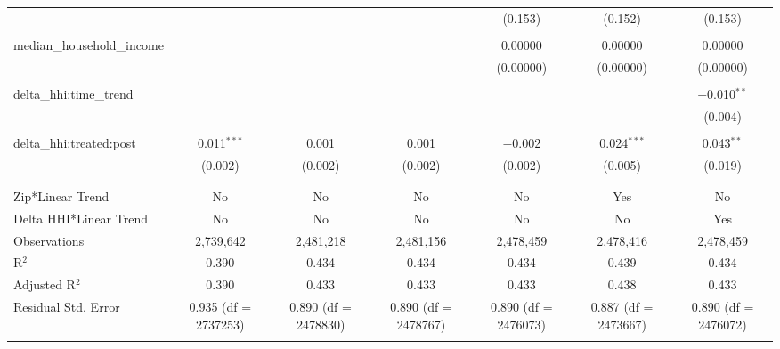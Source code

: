 \begin{table}[H]
{\begin{tabular}{@{\extracolsep{5pt}}lcccccc}
   &  &  &  & (0.153) & (0.152) & (0.153) \\  

   & & & & & & \\  

  median\_household\_income &  &  &  & 0.00000 & 0.00000 & 0.00000 \\  

   &  &  &  & (0.00000) & (0.00000) & (0.00000) \\  

   & & & & & & \\  

  delta\_hhi:time\_trend &  &  &  &  &  & $-$0.010$^{**}$ \\  

   &  &  &  &  &  & (0.004) \\  

   & & & & & & \\  

  delta\_hhi:treated:post & 0.011$^{***}$ & 0.001 & 0.001 & $-$0.002 & 0.024$^{***}$ & 0.043$^{**}$ \\  

   & (0.002) & (0.002) & (0.002) & (0.002) & (0.005) & (0.019) \\  

   & & & & & & \\  

 \hline \\[-1.8ex]  

 Zip*Linear Trend & No & No & No & No & Yes & No \\  

 Delta HHI*Linear Trend & No & No & No & No & No & Yes \\  

 Observations & 2,739,642 & 2,481,218 & 2,481,156 & 2,478,459 & 2,478,416 & 2,478,459 \\  

 R$^{2}$ & 0.390 & 0.434 & 0.434 & 0.434 & 0.439 & 0.434 \\  

 Adjusted R$^{2}$ & 0.390 & 0.433 & 0.433 & 0.433 & 0.438 & 0.433 \\  

 Residual Std. Error & 0.935 (df = 2737253) & 0.890 (df = 2478830) & 0.890 (df = 2478767) & 0.890 (df = 2476073) & 0.887 (df = 2473667) & 0.890 (df = 2476072) \\  

 \hline  

 \hline \\[-1.8ex]  


\end{tabular}}
\end{table}
